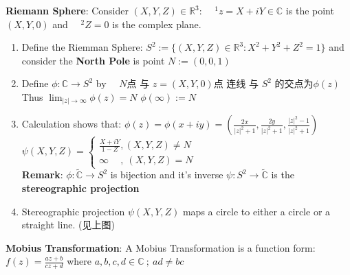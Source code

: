 \documentclass[9pt]{article}
\begin{document}
\textbf{Riemann Sphere}: Consider $(X,Y,Z)\in\mathbb{R}^3$: \ \ $^1z=X+iY\in\mathbb{C}$ is the point $(X,Y,0)$ and \ \ $^2 Z=0$ is the complex plane.

\begin{enumerate}[itemsep=-2pt, topsep=-2pt]
    \item Define the Riemman Sphere: $S^2:=\{(X,Y,Z)\in\mathbb{R}^3:X^2+Y^2+Z^2=1\}$ and consider the \textbf{North Pole} is point $N:=(0,0,1)$
    \item Define $\phi:\mathbb{C}\to S^2$ by \ \ $N$点 与 $z=(X,Y,0)$点 连线 与 $S^2$ 的交点为$\phi(z)$ \quad \quad Thus $\lim_{|z|\to\infty}\phi(z)=N$ \quad $\phi(\infty):=N$
    \item Calculation shows that: $\phi(z)=\phi(x+iy)=\left(\frac{2x}{|z|^2+1},\frac{2y}{|z|^2+1},\frac{|z|^2-1}{|z|^2+1}\right)$ \qquad \qquad $\psi(X,Y,Z)=\begin{cases}\frac{X+iY}{1-Z} , (X,Y,Z)\ne N \\ \infty \quad \ , \ (X,Y,Z)=N\end{cases}$ \\
    \textbf{Remark}: $\phi:\widetilde{\mathbb{C}}\to S^2$ is bijection and it's inverse $\psi:S^2\to\widetilde{\mathbb{C}}$ is the \textbf{stereographic projection}
    \item Stereographic projection $\psi(X,Y,Z)$ maps a circle to either a circle or a straight line. (见上图)
\end{enumerate}

\textbf{Mobius Transformation}: A Mobius Transformation is a function form: $f(z)=\frac{az+b}{cz+d}$ where $a,b,c,d\in\mathbb{C} \ ; \ ad\ne bc$
\end{document}
